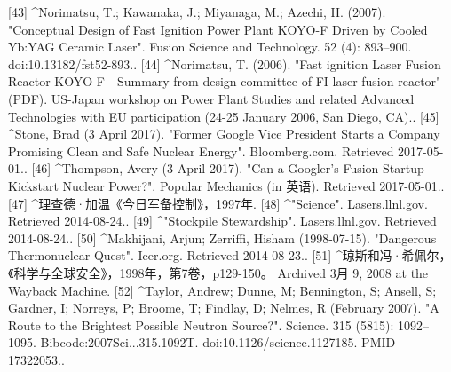 [43]
^Norimatsu, T.; Kawanaka, J.; Miyanaga, M.; Azechi, H. (2007). "Conceptual Design of Fast Ignition Power Plant KOYO-F Driven by Cooled Yb:YAG Ceramic Laser". Fusion Science and Technology. 52 (4): 893–900. doi:10.13182/fst52-893..
[44]
^Norimatsu, T. (2006). "Fast ignition Laser Fusion Reactor KOYO-F - Summary from design committee of FI laser fusion reactor" (PDF). US-Japan workshop on Power Plant Studies and related Advanced Technologies with EU participation (24-25 January 2006, San Diego, CA)..
[45]
^Stone, Brad (3 April 2017). "Former Google Vice President Starts a Company Promising Clean and Safe Nuclear Energy". Bloomberg.com. Retrieved 2017-05-01..
[46]
^Thompson, Avery (3 April 2017). "Can a Googler's Fusion Startup Kickstart Nuclear Power?". Popular Mechanics (in 英语). Retrieved 2017-05-01..
[47]
^理查德·加温《今日军备控制》，1997年.
[48]
^"Science". Lasers.llnl.gov. Retrieved 2014-08-24..
[49]
^"Stockpile Stewardship". Lasers.llnl.gov. Retrieved 2014-08-24..
[50]
^Makhijani, Arjun; Zerriffi, Hisham (1998-07-15). "Dangerous Thermonuclear Quest". Ieer.org. Retrieved 2014-08-23..
[51]
^琼斯和冯·希佩尔，《科学与全球安全》，1998年，第7卷，p129-150。 Archived 3月 9, 2008 at the Wayback Machine.
[52]
^Taylor, Andrew; Dunne, M; Bennington, S; Ansell, S; Gardner, I; Norreys, P; Broome, T; Findlay, D; Nelmes, R (February 2007). "A Route to the Brightest Possible Neutron Source?". Science. 315 (5815): 1092–1095. Bibcode:2007Sci...315.1092T. doi:10.1126/science.1127185. PMID 17322053..